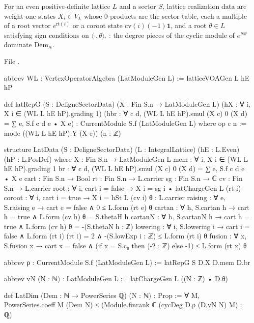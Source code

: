 \begin{definition}\label{l26:def:latdata}
For an even positive-definite lattice $L$ and a sector $S$, lattice realization data are weight-one states $X_i\in V_L$ whose
$0$-products are the sector table, each a multiple of a root vector $e^{\mathrm{rt}(i)}$ or a coroot state $\mathrm{cv}(i)(-1)\mathbf1$,
and a root $\theta\in L$ satisfying sign conditions on $\langle\cdot,\theta\rangle$. \textbf{}: the degree pieces of the
cyclic module of $e^{N\theta}$ dominate $\mathrm{Dem}_N$.
\end{definition}
\noindent File .
\begin{leancode}
abbrev WL : VertexOperatorAlgebra (LatModuleGen L) := latticeVOAGen L hE hP

def latRepG (S : DeligneSectorData) (X : Fin S.n → LatModuleGen L)
    (hX : ∀ i, X i ∈ (WL L hE hP).grading 1)
    (hbr : ∀ c d, (WL L hE hP).smul (X c) 0 (X d) = ∑ e, S.f c d e • X e) :
    CurrentModule S.f (LatModuleGen L) where
  op c n := mode ((WL L hE hP).Y (X c)) (n : ℤ)

structure LatData (S : DeligneSectorData) (L : IntegralLattice) (hE : L.Even) (hP : L.PosDef) where
  X : Fin S.n → LatModuleGen L
  mem : ∀ i, X i ∈ (WL L hE hP).grading 1
  br : ∀ c d, (WL L hE hP).smul (X c) 0 (X d) = ∑ e, S.f c d e • X e
  cart : Fin S.n → Bool
  rt : Fin S.n → L.carrier
  sg : Fin S.n → ℂ
  cv : Fin S.n → L.carrier
  root : ∀ i, cart i = false → X i = sg i • latChargeGen L (rt i)
  coroot : ∀ i, cart i = true → X i = hSt L (cv i)
  θ : L.carrier
  raising : ∀ e, S.raising e → cart e = false ∧ 0 ≤ L.form (rt e) θ
  cartan : ∀ h, S.cartan h → cart h = true ∧ L.form (cv h) θ = S.thetaH h
  cartanN : ∀ h, S.cartanN h → cart h = true ∧ L.form (cv h) θ = -(S.thetaN h : ℤ)
  lowering : ∀ i, S.lowering i → cart i = false ∧ L.form (rt i) (rt i) = 2 ∧
    -(S.lowExp i : ℤ) ≤ L.form (rt i) θ
  fusion : ∀ x, S.fusion x → cart x = false ∧ (if x = S.c₀ then (-2 : ℤ) else -1) ≤ L.form (rt x) θ

abbrev ρ : CurrentModule S.f (LatModuleGen L) := latRepG S D.X D.mem D.br

abbrev vN (N : ℕ) : LatModuleGen L := latChargeGen L ((N : ℤ) • D.θ)

def LatDim (Dem : ℕ → PowerSeries ℚ) (N : ℕ) : Prop :=
  ∀ M, PowerSeries.coeff M (Dem N) ≤ (Module.finrank ℂ (cycDeg D.ρ (D.vN N) M) : ℚ)
\end{leancode}

